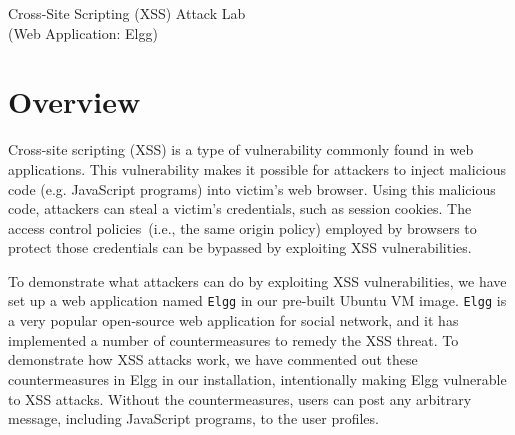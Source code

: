 
\newcommand{\commonfolder}{../../common-files}
\newcommand{\webcommon}{../Web_Common}









\begin{center}
{\LARGE Cross-Site Scripting (XSS) Attack Lab}
\vspace{0.1in}\\
{\Large (Web Application: Elgg)}
\end{center}


\section{Overview}

Cross-site scripting (XSS) is a type of vulnerability commonly found
in web applications.  This vulnerability makes it possible for
attackers to inject malicious code (e.g. JavaScript programs) into victim's
web browser. Using this malicious code, attackers can steal a
victim's credentials, such as session cookies.  The access control 
policies~(i.e., the same origin policy) employed by browsers to protect
those credentials can be bypassed by exploiting XSS vulnerabilities.

To demonstrate what attackers can do by exploiting XSS
vulnerabilities, we have set up a web application named 
{\tt Elgg} in our pre-built Ubuntu VM image.
{\tt Elgg} is a very popular open-source web application for
social network, and it has implemented a number of countermeasures 
to remedy the XSS threat. To demonstrate how XSS attacks work, we 
have commented out these countermeasures in Elgg in our installation, 
intentionally making Elgg vulnerable to XSS attacks.  
Without the countermeasures, users 
can post any arbitrary message, including JavaScript
programs, to the user profiles.  

